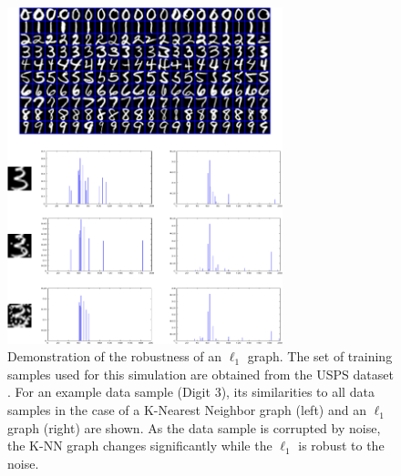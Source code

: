 \begin{figure}[t]
\begin{minipage}[b]{1.0\linewidth}
  \centering
  \includegraphics[width=8cm]{l1demo.png}
\end{minipage}
\caption{Demonstration of the robustness of an $\ell_1$ graph. The set of training samples used for this simulation are obtained from the USPS dataset \cite{USPSdata}. For an example data sample (Digit $3$), its similarities to all data samples in the case of a K-Nearest Neighbor graph (left) and an $\ell_1$ graph (right) are shown. As the data sample is corrupted by noise, the K-NN graph changes significantly while the $\ell_1$ is robust to the noise.}
\label{Fig:l1demo}
\end{figure}

